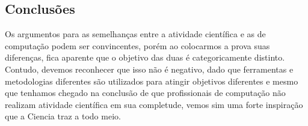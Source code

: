 \subsection{Conclusões}
    Os argumentos para as semelhanças entre a atividade científica e as de computação podem ser convincentes, porém ao colocarmos a prova suas diferenças, fica aparente que o objetivo das duas é categoricamente distinto. Contudo, devemos reconhecer que isso não é negativo, dado que ferramentas e metodologias diferentes são utilizados para atingir objetivos diferentes e mesmo que tenhamos chegado na conclusão de que profissionais de computação não realizam atividade científica em sua completude, vemos sim uma forte inspiração que a \gls{Ciencia} traz a todo meio.